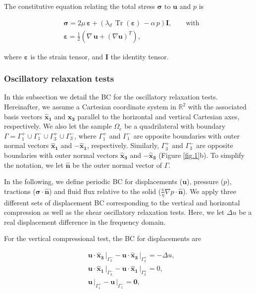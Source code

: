 \documentclass[draft]{agujournal2019}
\DeclareMathOperator{\tr}{Tr}
\begin{document}
The constitutive equation relating the total stress $\bm{\sigma}$ to $\bm{u}$ and $p$ is
\begin{linenomath*}
\begin{equation}\label{Eq.7}
\begin{split}
& \bm{\sigma} =  2\mu \, \bm{\varepsilon} +  \left( \lambda_d \,  \tr( \bm{\varepsilon})\, - \alpha \,p \right) \bm{I}, \qquad \text{with}\\
& \bm{\varepsilon} = \frac{1}{2} \left( \nabla \,\bm{u} + ({\nabla  \bm{u}})^T  \right),
 \end{split}
\end{equation}
\end{linenomath*}
where $\bm{\varepsilon}$ is the strain tensor,
and $\bm{I}$ the identity tensor. 

 
\subsubsection{Oscillatory relaxation tests}
In this subsection we detail the BC for the oscillatory relaxation tests. 
Hereinafter, we assume a Cartesian coordinate system in $\mathbb R^2$ with the associated basis vectors $\bm{\hat x_1}$ and $\bm{\hat x_3}$ parallel to the horizontal and vertical Cartesian axes, respectively. We also
let the sample $\Omega_e$ be a quadrilateral with boundary $\Gamma = \Gamma_1^+ \cup \Gamma_1^- \cup \Gamma_3^+ \cup \Gamma_3^- $, where $\Gamma_1^+ $ and $\Gamma_1^- $ are opposite boundaries with outer normal vectors $\bm{\hat x_1}$ and $ -\bm{\hat x_1}$, respectively. Similarly, $\Gamma_3^+ $ and $\Gamma_3^- $ are opposite boundaries with outer normal vectors $\bm{\hat x_3}$ and $ -\bm{\hat x_3}$ (Figure \ref{fig.1}b). To simplify the notation, we let $ \bm{\hat n}$ be the outer normal vector
of $\Gamma$.

In the following, we define periodic BC for displacements ($\bm{u}$), pressure ($p$), tractions ($\bm{\sigma}\cdot \bm{\hat n} $) and fluid flux relative to the solid ($\frac{\kappa}{\eta} \nabla p \cdot \bm{\hat n}$). We apply three different sets of displacement BC corresponding to the vertical and horizontal compression as well as the shear oscillatory relaxation tests. Here, we let $\Delta u$ be a real displacement difference in the frequency domain.

For the vertical compressional test, the BC for displacements are
\begin{linenomath*}
\begin{equation}\label{Eq.8}
\begin{split}
&  \bm{u} \cdot \bm{\hat{x}_3} \, \vert_{\Gamma_3^-} - \bm{u}\cdot \bm{\hat{x}_3}\, \vert_{\Gamma_3^+} =- \Delta u, \\
&  \bm{u} \cdot \bm{\hat{x}_1}\, \vert_{\Gamma_3^-} - \bm{u} \cdot \bm{\hat{x}_1} \, \vert_{\Gamma_3^+} = 0, \\
& \bm{u}\,\vert_{\Gamma_1^+} - \bm{u}\,\vert_{\Gamma_1^-} = \bm{0},
\end{split}
\end{equation}
\end{linenomath*}
\end{document}
